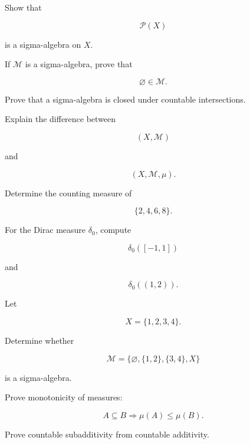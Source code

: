 \begin{exercise}[1]
Show that

\[
\mathcal{P}(X)
\]

is a sigma-algebra on \(X\).
\end{exercise}

\begin{exercise}[1]
If \(\mathcal{M}\) is a sigma-algebra, prove that

\[
\varnothing\in\mathcal{M}.
\]
\end{exercise}

\begin{exercise}[1]
Prove that a sigma-algebra is closed under countable intersections.
\end{exercise}

\begin{exercise}[1]
Explain the difference between

\[
(X,\mathcal{M})
\]

and

\[
(X,\mathcal{M},\mu).
\]
\end{exercise}

\begin{exercise}[1]
Determine the counting measure of

\[
\{2,4,6,8\}.
\]
\end{exercise}

\begin{exercise}[1]
For the Dirac measure \(\delta_0\), compute

\[
\delta_0([-1,1])
\]

and

\[
\delta_0((1,2)).
\]
\end{exercise}

\begin{exercise}[2]
Let

\[
X=\{1,2,3,4\}.
\]

Determine whether

\[
\mathcal{M}
=
\{
\varnothing,
\{1,2\},
\{3,4\},
X
\}
\]

is a sigma-algebra.
\end{exercise}

\begin{exercise}[2]
Prove monotonicity of measures:

\[
A\subseteq B
\Longrightarrow
\mu(A)\leq\mu(B).
\]
\end{exercise}

\begin{exercise}[2]
Prove countable subadditivity from countable additivity.
\end{exercise}

